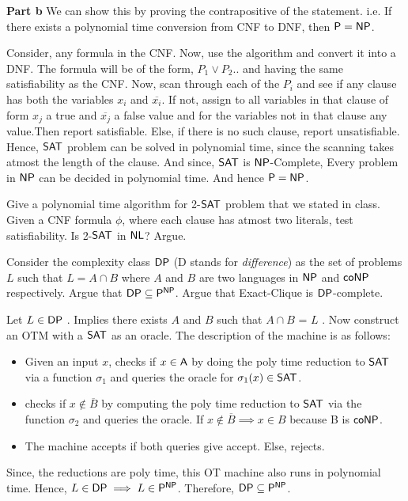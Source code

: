 \documentclass[12pt]{exam}
\begin{document}
\begin{questions}
\begin{solution}
\textbf{Part b} \newline
We can show this by proving the contrapositive of the statement. i.e. If there exists a polynomial time conversion from {\sc CNF} to {\sc DNF}, then ${\mathsf{P}} = {\mathsf{NP}}$.
\newline

Consider, any formula in the {\sc CNF}. Now, use the algorithm and convert it into a {\sc DNF}. The formula will be of the form, $P_{1} \vee P_{2} ..$
and having the same satisfiability as the {\sc CNF}. Now, scan through each of the $P_{i}$ and see if any clause has both the variables $x_{i}$ and $\overline{x_{i}}$.
If not, assign to all variables in that clause of form $x_{j}$ a true and $\overline{x_{j}}$ a false value and for the variables not in that clause any value.Then report satisfiable. Else, if there is no such clause, report unsatisfiable. \newline
Hence, ${\mathsf{SAT}}$ problem can be solved in polynomial time, since the scanning takes atmost the length of the clause. And since, ${\mathsf{SAT}}$ is ${\mathsf{NP}}$-Complete,
Every problem in ${\mathsf{NP}}$ can be decided in polynomial time. And hence ${\mathsf{P}} = {\mathsf{NP}}$.

\end{solution}


\question
Give a polynomial time algorithm for 2-${\mathsf{SAT}}$ problem that we stated in class. Given a CNF formula $\phi$, where each clause has atmost two literals, test satisfiability. Is 2-${\mathsf{SAT}}$ in ${\mathsf{NL}}$? Argue.

\question
Consider the complexity class ${\mathsf{DP}}$ ({\sc D} stands for \textit{difference}) as the set of problems $L$ such that $L = A \cap B$ where $A$ and $B$ are two languages in ${\mathsf{NP}}$ and ${\mathsf{co}}{\mathsf{NP}}$ respectively. Argue that ${\mathsf{DP}} \subseteq {\ensuremath{\mathsf{P}}}^{{\mathsf{NP}}}$. Argue that {\sc Exact-Clique} is ${\mathsf{DP}}$-complete.

\begin{solution}
  Let $L \in {\ensuremath{\mathsf{DP}}}$ . Implies there exists $A$ and $B$ such that $A \cap B$ = $L$ . Now construct an OTM with a ${\mathsf{SAT}}$ as an oracle.
  The description of the machine is as follows:
  \begin{itemize}
   \item Given an input $x$, checks if $x \in {\ensuremath{\mathsf{A}}}$ by doing the poly time reduction to ${\mathsf{SAT}}$ via a function $\sigma_{1}$ and queries the oracle 
   for $\sigma_{1}(x) \in {\ensuremath{\mathsf{SAT}}}$.
   \item checks if $x \notin \overline{B}$ by computing the poly time reduction to ${\mathsf{SAT}}$ via the function $\sigma_{2}$ and queries the oracle.
   If $x \notin \overline{B} \implies x \in B$ because B is ${\mathsf{co}}{\mathsf{NP}}$.
   \item The machine accepts if both queries give accept. Else, rejects.
  \end{itemize}
  Since, the reductions are poly time, this OT machine also runs in polynomial time. Hence, $L \in {\ensuremath{\mathsf{DP}}} \implies L \in {\ensuremath{\mathsf{P}}}^{{\mathsf{NP}}}$.
  Therefore, ${\mathsf{DP}} \subseteq {\ensuremath{\mathsf{P}}}^{{\mathsf{NP}}}$.
  

\end{solution}
\end{questions}
\end{document}
